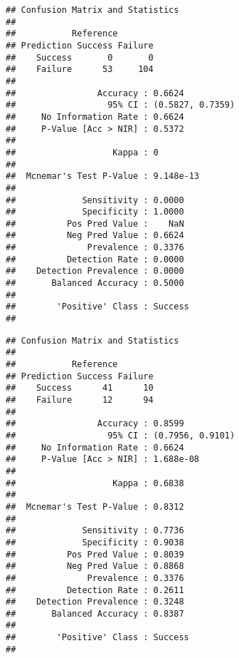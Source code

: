 \documentclass[
]{article}
\newenvironment{Shaded}{\begin{snugshade}}{\end{snugshade}}
\newcommand{\AttributeTok}[1]{\textcolor[rgb]{0.77,0.63,0.00}{#1}}
\newcommand{\CommentTok}[1]{\textcolor[rgb]{0.56,0.35,0.01}{\textit{#1}}}
\newcommand{\FunctionTok}[1]{\textcolor[rgb]{0.00,0.00,0.00}{#1}}
\newcommand{\NormalTok}[1]{#1}
\newcommand{\OtherTok}[1]{\textcolor[rgb]{0.56,0.35,0.01}{#1}}
\newcommand{\SpecialCharTok}[1]{\textcolor[rgb]{0.00,0.00,0.00}{#1}}
\newcommand{\StringTok}[1]{\textcolor[rgb]{0.31,0.60,0.02}{#1}}
\begin{document}
\begin{verbatim}
## Confusion Matrix and Statistics
## 
##           Reference
## Prediction Success Failure
##    Success       0       0
##    Failure      53     104
##                                           
##                Accuracy : 0.6624          
##                  95% CI : (0.5827, 0.7359)
##     No Information Rate : 0.6624          
##     P-Value [Acc > NIR] : 0.5372          
##                                           
##                   Kappa : 0               
##                                           
##  Mcnemar's Test P-Value : 9.148e-13       
##                                           
##             Sensitivity : 0.0000          
##             Specificity : 1.0000          
##          Pos Pred Value :    NaN          
##          Neg Pred Value : 0.6624          
##              Prevalence : 0.3376          
##          Detection Rate : 0.0000          
##    Detection Prevalence : 0.0000          
##       Balanced Accuracy : 0.5000          
##                                           
##        'Positive' Class : Success         
## 
\end{verbatim}

\begin{Shaded}
\end{Shaded}

\begin{verbatim}
## Confusion Matrix and Statistics
## 
##           Reference
## Prediction Success Failure
##    Success      41      10
##    Failure      12      94
##                                           
##                Accuracy : 0.8599          
##                  95% CI : (0.7956, 0.9101)
##     No Information Rate : 0.6624          
##     P-Value [Acc > NIR] : 1.688e-08       
##                                           
##                   Kappa : 0.6838          
##                                           
##  Mcnemar's Test P-Value : 0.8312          
##                                           
##             Sensitivity : 0.7736          
##             Specificity : 0.9038          
##          Pos Pred Value : 0.8039          
##          Neg Pred Value : 0.8868          
##              Prevalence : 0.3376          
##          Detection Rate : 0.2611          
##    Detection Prevalence : 0.3248          
##       Balanced Accuracy : 0.8387          
##                                           
##        'Positive' Class : Success         
## 
\end{verbatim}
\end{document}
